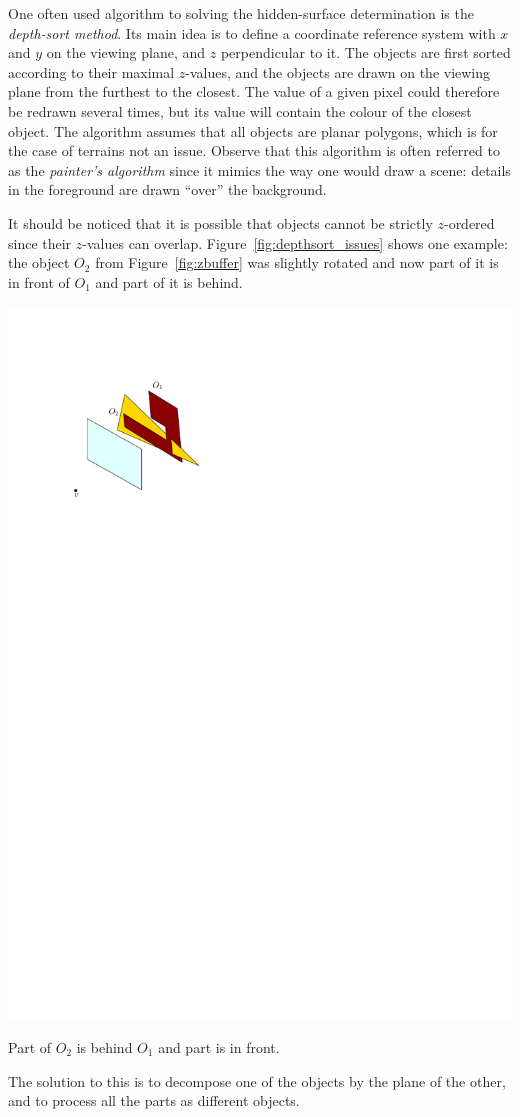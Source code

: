 %

One often used algorithm to solving the hidden-surface determination is the \emph{depth-sort method}.
Its main idea is to define a coordinate reference system with $x$ and $y$ on the viewing plane, and $z$ perpendicular to it.
The objects are first sorted according to their maximal $z$-values, and the objects are drawn on the viewing plane from the furthest to the closest.
The value of a given pixel could therefore be redrawn several times, but its value will contain the colour of the closest object.
The algorithm assumes that all objects are planar polygons, which is for the case of terrains not an issue.
Observe that this algorithm is often referred to as the \emph{painter's algorithm} since it mimics the way one would draw a scene: details in the foreground are drawn ``over'' the background.

%

It should be noticed that it is possible that objects cannot be strictly $z$-ordered since their $z$-values can overlap.
Figure~\ref{fig:depthsort_issues} shows one example: the object $O_2$ from Figure~\ref{fig:zbuffer} was slightly rotated and now part of it is in front of $O_1$ and part of it is behind.
\begin{marginfigure}
  \centering
  \includegraphics[width=\linewidth]{depthsort_issues.pdf}
  \caption{Part of $O_2$ is behind $O_1$ and part is in front.}%
\label{fig:depthsort_issues}
\end{marginfigure}
The solution to this is to decompose one of the objects by the plane of the other, and to process all the parts as different objects.

